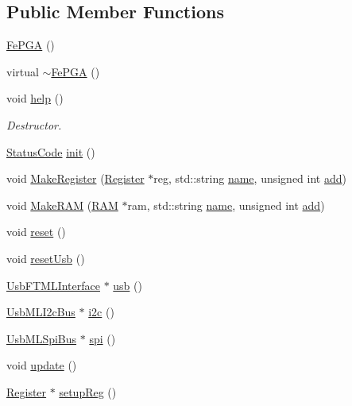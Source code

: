 \subsection*{Public Member Functions}
\begin{DoxyCompactItemize}
\item 
\hyperlink{classFePGA_a377ae8860fbb3162e0c49dd08197a670}{Fe\+P\+GA} ()
\item 
virtual \hyperlink{classFePGA_aa445095a44c521b6b7803feaef6c16ba}{$\sim$\+Fe\+P\+GA} ()
\item 
void \hyperlink{classFePGA_ae6425fbad1a8db57025efaf387a6f41b}{help} ()
\begin{DoxyCompactList}\small\item\em Destructor. \end{DoxyCompactList}\item 
\hyperlink{classStatusCode}{Status\+Code} \hyperlink{classFePGA_a5355858b1b8deedcc12acff80f025804}{init} ()
\item 
void \hyperlink{classFePGA_aa58fc0a09d8efa7abc2766bf5bb67327}{Make\+Register} (\hyperlink{classRegister}{Register} $\ast$reg, std\+::string \hyperlink{classObject_a300f4c05dd468c7bb8b3c968868443c1}{name}, unsigned int \hyperlink{classAttrib_a235f773af19c900264a190b00a3b4ad7}{add})
\item 
void \hyperlink{classFePGA_ac3af50fbe7f8f7a8c6adbcb164cbbf47}{Make\+R\+AM} (\hyperlink{classRAM}{R\+AM} $\ast$ram, std\+::string \hyperlink{classObject_a300f4c05dd468c7bb8b3c968868443c1}{name}, unsigned int \hyperlink{classAttrib_a235f773af19c900264a190b00a3b4ad7}{add})
\item 
void \hyperlink{classFePGA_abdf7a9dd901351a7eafd748d35172a3c}{reset} ()
\item 
void \hyperlink{classFePGA_a79d95b2fccf4d2ea473e6cf6980d6cf6}{reset\+Usb} ()
\item 
\hyperlink{classUsbFTMLInterface}{Usb\+F\+T\+M\+L\+Interface} $\ast$ \hyperlink{classFePGA_a4a7889dc3c2f88f623876ca475e66410}{usb} ()
\item 
\hyperlink{classUsbMLI2cBus}{Usb\+M\+L\+I2c\+Bus} $\ast$ \hyperlink{classFePGA_a1553db5010cce9e3495aa3060baf0b3c}{i2c} ()
\item 
\hyperlink{classUsbMLSpiBus}{Usb\+M\+L\+Spi\+Bus} $\ast$ \hyperlink{classFePGA_ab54f9f61e87f1cced6c4ba19eb38a848}{spi} ()
\item 
void \hyperlink{classFePGA_ad23605ae261d2aa0562cbb732661b2c4}{update} ()
\item 
\hyperlink{classRegister}{Register} $\ast$ \hyperlink{classFePGA_aa0657c6ef809f3f6b54613f237750cc4}{setup\+Reg} ()

\end{DoxyCompactItemize}
